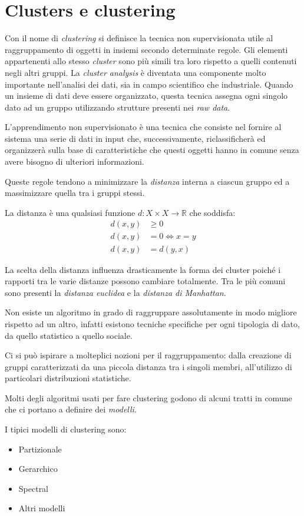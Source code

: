\chapter{Clusters e clustering}
	Con il nome di \emph{clustering} si definisce la tecnica non supervisionata utile al raggruppamento di oggetti in insiemi secondo determinate regole. Gli elementi appartenenti allo stesso \emph{cluster} sono più simili tra loro rispetto a quelli contenuti negli altri gruppi. La \emph{cluster analysis} è diventata una componente molto importante nell'analisi dei dati, sia in campo scientifico che industriale. Quando un insieme di dati deve essere organizzato, questa tecnica assegna ogni singolo dato ad un gruppo utilizzando strutture presenti nei \emph{raw data}.

	L'apprendimento non supervisionato è una tecnica che consiste nel fornire al sistema una serie di dati in input che, successivamente, riclassificherà ed organizzerà sulla base di caratteristiche che questi oggetti hanno in comune senza avere bisogno di ulteriori informazioni.

	Queste regole tendono a minimizzare la \emph{distanza} interna a ciascun gruppo ed a massimizzare quella tra i gruppi stessi.

	La distanza è una qualsiasi funzione $d:X \times X \to \mathbb{R}$ che soddisfa:
	\begin{align*}
		d(x,y) &\geq 0 \\
		d(x,y) &= 0 \iff x=y \\
		d(x,y) &= d(y,x)
	\end{align*}

	La scelta della distanza influenza drasticamente la forma dei cluster poiché i rapporti tra le varie distanze possono cambiare totalmente. Tra le più comuni sono presenti la \emph{distanza euclidea} e la \emph{distanza di Manhattan}.

	Non esiste un algoritmo in grado di raggruppare assolutamente in modo migliore rispetto ad un altro, infatti esistono tecniche specifiche per ogni tipologia di dato, da quello statistico a quello sociale.

	Ci si può ispirare a molteplici nozioni per il raggruppamento: dalla creazione di gruppi caratterizzati da una piccola distanza tra i singoli membri, all’utilizzo di particolari distribuzioni statistiche.

	Molti degli algoritmi usati per fare clustering godono di alcuni tratti in comune che ci portano a definire dei \emph{modelli}.

	I tipici modelli di clustering sono:
	\begin{itemize}
		\item Partizionale
		\item Gerarchico
		\item Spectral
		\item Altri modelli
	\end{itemize}

	
	
	
	
